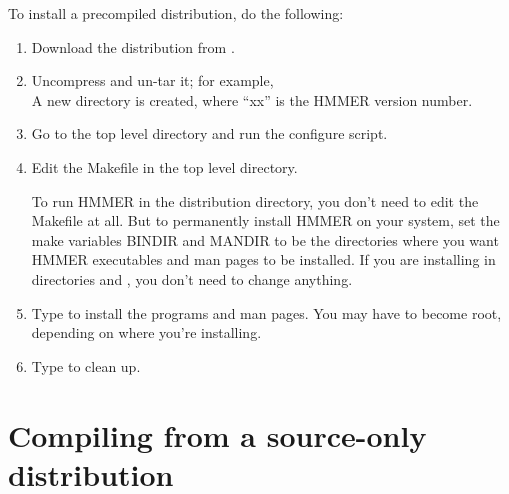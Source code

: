 To install a precompiled distribution, do the following:

\begin{enumerate}
\item Download the distribution from .

\item Uncompress and un-tar it; for example, \\
	A new directory  is created, where ``xx'' is
	the HMMER version number.
\item Go to the top level directory and run the
      configure script.\\
\item Edit the Makefile in the top level directory.

To run HMMER in the distribution directory, you don't need
to edit the Makefile at all. But to permanently install HMMER on your
system, set the make variables BINDIR and MANDIR to be the directories
where you want HMMER executables and man pages to be installed. If you
are installing in directories  and
,
you don't need to change anything.

\item Type  to install the programs and man pages. 
You may have to become root, depending on where you're installing.

\item Type  to clean up.
\end{enumerate}

\section{Compiling from a source-only distribution}

